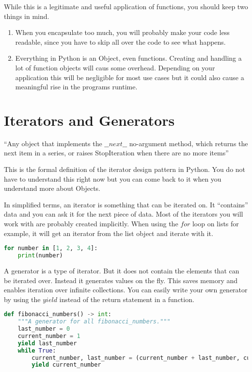 \documentclass{article}
\newcommand{\qq}[1]{``#1''}
\begin{document}
While this is a legitimate and useful application of functions, you should keep
two things in mind.

\begin{enumerate}
    \item When you encapsulate too much, you will probably make your code less readable, since you have to skip all over the code to see what happens.
    \item Everything in Python is an Object, even functions.
          Creating and handling a lot of function objects will caus some overhead.
          Depending on your application this will be negligible for most use cases but it could also cause a meaningful rise in the programs runtime.
\end{enumerate}

\section{Iterators and Generators }\label{generators}

\qq{Any object that implements the $\_\_next\_\_$ no-argument method,
    which returns the next item in a series, or raises StopIteration
    when there are no more items}\cite{Ram2015}

This is the formal definition of the iterator design pattern in Python.
You do not have to understand this right now but you can come back to it when
you understand more about Objects.


In simplified terms, an iterator is something that can be iterated on.
It \qq{contains} data and you can ask it for the next piece of data.
Most of the iterators you will work with are probably created implicitly.
When using the $for$ loop on lists for example, it will get an iterator from the
list object and iterate with it.

\begin{lstlisting}[language=Python]
for number in [1, 2, 3, 4]:
    print(number)
\end{lstlisting}

A generator is a type of iterator.
But it does not contain the elements that can be iterated over.
Instead it generates values on the fly.
This saves memory and enables iteration over infinite collections.
You can easily write your own generator by using the $yield$ instead of the
return statement in a function.

\begin{lstlisting}[language=Python]
def fibonacci_numbers() -> int:
    """A generator for all fibonacci_numbers."""
    last_number = 0
    current_number = 1
    yield last_number
    while True:
        current_number, last_number = (current_number + last_number, current_number)
        yield current_number
\end{lstlisting}
\end{document}
